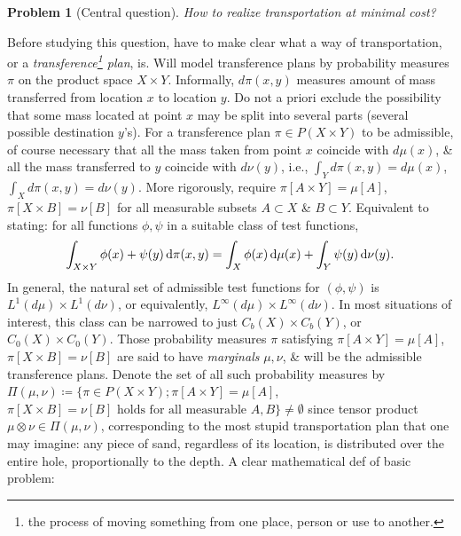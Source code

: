 \documentclass{article}
\newtheorem{problem}{Problem}
\begin{document}
\begin{enumerate}
\begin{itemize}
		\begin{problem}[Central question]
			How to realize transportation at minimal cost?
		\end{problem}
		Before studying this question, have to make clear what a way of transportation, or a {\it transference\footnote{the process of moving something from one place, person or use to another.} plan}, is. Will model transference plans by probability measures $\pi$ on the product space $X\times Y$. Informally, $d\pi(x,y)$ measures amount of mass transferred from location $x$ to location $y$. Do not a priori exclude the possibility that some mass located at point $x$ may be split into several parts (several possible destination $y$'s). For a transference plan $\pi\in P(X\times Y)$ to be admissible, of course necessary that all the mass taken from point $x$ coincide with $d\mu(x)$, \& all the mass transferred to $y$ coincide with $d\nu(y)$, i.e., $\int_Y d\pi(x,y) = d\mu(x)$, $\int_X d\pi(x,y) = d\nu(y)$. More rigorously, require $\pi[A\times Y] = \mu[A]$, $\pi[X\times B] = \nu[B]$ for all measurable subsets $A\subset X$ \& $B\subset Y$. Equivalent to stating: for all functions $\phi,\psi$ in a suitable class of test functions,
		\begin{equation}
			\int_{X\times Y} \phi(x) + \psi(y)\,{\rm d}\pi(x,y) = \int_X \phi(x)\,{\rm d}\mu(x) + \int_Y \psi(y)\,{\rm d}\nu(y).
		\end{equation}
		In general, the natural set of admissible test functions for $(\phi,\psi)$ is $L^1(d\mu)\times L^1(d\nu)$, or equivalently, $L^\infty(d\mu)\times L^\infty(d\nu)$. In most situations of interest, this class can be narrowed to just $C_b(X)\times C_b(Y)$, or $C_0(X)\times C_0(Y)$. Those probability measures $\pi$ satisfying $\pi[A\times Y] = \mu[A]$, $\pi[X\times B] = \nu[B]$ are said to have {\it marginals} $\mu,\nu$, \& will be the admissible transference plans. Denote the set of all such probability measures by $\Pi(\mu,\nu)\coloneqq\{\pi\in P(X\times Y);\pi[A\times Y] = \mu[A]$, $\pi[X\times B] = \nu[B]\mbox{ holds for all measurable } A,B\}\ne\emptyset$ since tensor product $\mu\otimes\nu\in\Pi(\mu,\nu)$, corresponding to the most stupid transportation plan that one may imagine: any piece of sand, regardless of its location, is distributed over the entire hole, proportionally to the depth. A clear mathematical def of basic problem:
		

\end{itemize}
\end{enumerate}
\end{document}
